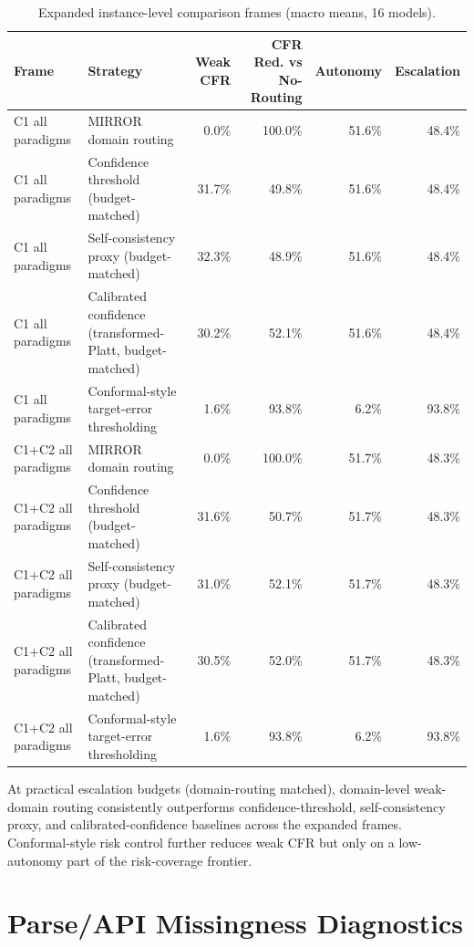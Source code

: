 \documentclass[10pt]{article}
\begin{document}
\begin{table}[h]
\centering
\caption{Expanded instance-level comparison frames (macro means, 16 models).}
\label{tab:instance-baselines-expanded}
\small
\begin{tabular}{llrrrr}
\toprule
Frame & Strategy & Weak CFR & CFR Red. vs No-Routing & Autonomy & Escalation \\
\midrule
C1 all paradigms & MIRROR domain routing & 0.0\% & 100.0\% & 51.6\% & 48.4\% \\
C1 all paradigms & Confidence threshold (budget-matched) & 31.7\% & 49.8\% & 51.6\% & 48.4\% \\
C1 all paradigms & Self-consistency proxy (budget-matched) & 32.3\% & 48.9\% & 51.6\% & 48.4\% \\
C1 all paradigms & Calibrated confidence (transformed-Platt, budget-matched) & 30.2\% & 52.1\% & 51.6\% & 48.4\% \\
C1 all paradigms & Conformal-style target-error thresholding & 1.6\% & 93.8\% & 6.2\% & 93.8\% \\
\midrule
C1+C2 all paradigms & MIRROR domain routing & 0.0\% & 100.0\% & 51.7\% & 48.3\% \\
C1+C2 all paradigms & Confidence threshold (budget-matched) & 31.6\% & 50.7\% & 51.7\% & 48.3\% \\
C1+C2 all paradigms & Self-consistency proxy (budget-matched) & 31.0\% & 52.1\% & 51.7\% & 48.3\% \\
C1+C2 all paradigms & Calibrated confidence (transformed-Platt, budget-matched) & 30.5\% & 52.0\% & 51.7\% & 48.3\% \\
C1+C2 all paradigms & Conformal-style target-error thresholding & 1.6\% & 93.8\% & 6.2\% & 93.8\% \\
\bottomrule
\end{tabular}
\end{table}

At practical escalation budgets (domain-routing matched), domain-level weak-domain
routing consistently outperforms confidence-threshold, self-consistency proxy,
and calibrated-confidence baselines across the expanded frames. Conformal-style
risk control further reduces weak CFR but only on a low-autonomy part of the
risk-coverage frontier.

\section{Parse/API Missingness Diagnostics}
\label{app:missingness}
\end{document}

